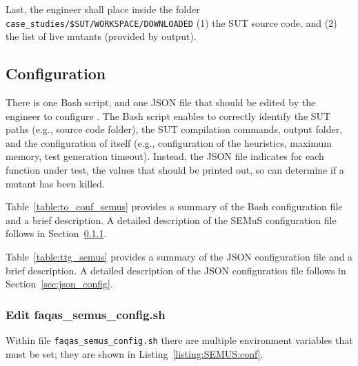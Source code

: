 Last, the engineer shall place inside the folder \texttt{case\_studies/\$SUT/WORKSPACE/DOWNLOADED} (1) the SUT source code, and (2) the list of live mutants (provided by \MASS output).

\subsection{\SEMUS Configuration}

There is one Bash script, and one JSON file that should be edited by the engineer to configure \SEMUS. The Bash script enables \SEMUS to correctly identify the SUT paths (e.g., source code folder), the SUT compilation commands, output folder, and the configuration of \SEMUS itself (e.g., configuration of the heuristics, maximum memory, test generation timeout). Instead, the JSON file indicates for each function under test, the values that should be printed out, so \SEMUS can determine if a mutant has been killed.



Table~\ref{table:to_conf_semus} provides a summary of the Bash \SEMUS configuration file and a brief description. A detailed description of the SEMuS configuration file follows in Section~\ref{sec:semus_config}.



Table~\ref{table:ttg_semus} provides a summary of the JSON \SEMUS configuration file and a brief description. A detailed description of the JSON configuration file follows in Section~\ref{sec:json_config}.


\subsubsection{Edit faqas\_semus\_config.sh}
\label{sec:semus_config}

Within file \texttt{faqas\_semus\_config.sh} there are multiple environment variables that must be set; they are shown in Listing~\ref{listing:SEMUS:conf}.

